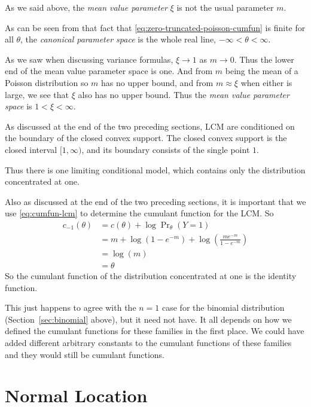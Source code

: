 As we said above, the \emph{mean value parameter} $\xi$ is not
the usual parameter $m$.

As can be seen from that fact that \eqref{eq:zero-truncated-poisson-cumfun}
is finite for all $\theta$,
the \emph{canonical parameter space} is
the whole real line, $- \infty < \theta < \infty$.

As we saw when discussing variance formulas, $\xi \to 1$ as $m \to 0$.
Thus the lower end of the mean value parameter space is one.
And from $m$ being the mean of a Poisson distribution so $m$ has
no upper bound, and from $m \approx \xi$ when either is large, we see that
$\xi$ also has no upper bound.  Thus
the \emph{mean value parameter space} is $1 < \xi < \infty$.

As discussed at the end of the two preceding sections, LCM
are conditioned on the boundary of the closed convex support.
The closed convex support is the closed interval $[1, \infty)$, and its
boundary consists of the single point $1$.

Thus there is one limiting conditional model, which contains only
the distribution concentrated at one.

Also as discussed at the end of the two preceding sections,
it is important that we use \eqref{eq:cumfun-lcm} to determine the cumulant
function for the LCM.  So
\begin{align*}
   c_{- 1}(\theta)
   & =
   c(\theta) + \log \Pr\nolimits_\theta(Y = 1)
   \\
   & =
   m + \log(1 - e^{- m})
   +
   \log \left(\frac{m e^{- m}}{1 - e^{- m}}\right)
   \\
   & =
   \log(m)
   \\
   & =
   \theta
\end{align*}
So the cumulant function of the distribution concentrated at one is the
identity function.

This just happens to agree with the $n = 1$ case for the binomial
distribution (Section~\ref{sec:binomial} above), but it need not have.
It all depends on how we defined the cumulant functions for these families
in the first place.  We could have added different arbitrary constants
to the cumulant functions of these families and they would still be
cumulant functions.

\section{Normal Location} \label{sec:normal-location}

